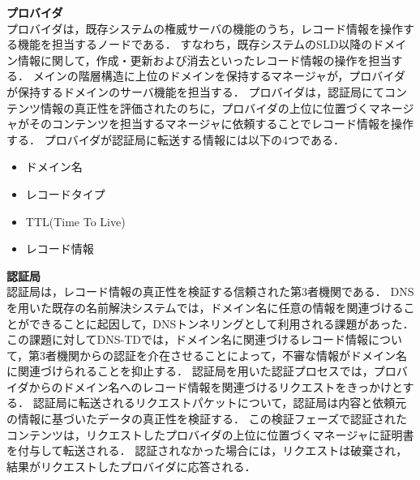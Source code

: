 \newpage
\hspace{-12pt}\textbf{プロバイダ}\\
\hspace{12pt}プロバイダは，既存システムの権威サーバの機能のうち，レコード情報を操作する機能を担当するノードである．
すなわち，既存システムのSLD以降のドメイン情報に関して，作成・更新および消去といったレコード情報の操作を担当する．
メインの階層構造に上位のドメインを保持するマネージャが，プロバイダが保持するドメインのサーバ機能を担当する．
プロバイダは，認証局にてコンテンツ情報の真正性を評価されたのちに，プロバイダの上位に位置づくマネージャがそのコンテンツを担当するマネージャに依頼することでレコード情報を操作する．
プロバイダが認証局に転送する情報には以下の4つである．
\begin{itemize}
 \item ドメイン名
 \vspace{-3mm}
 \item レコードタイプ
 \vspace{-3mm}
 \item TTL(Time To Live)
 \vspace{-3mm}
 \item レコード情報
\end{itemize}

\newpage
\hspace{-12pt}\textbf{認証局}\\
\hspace{12pt}認証局は，レコード情報の真正性を検証する信頼された第3者機関である．
DNSを用いた既存の名前解決システムでは，ドメイン名に任意の情報を関連づけることができることに起因して，DNSトンネリングとして利用される課題があった．
この課題に対してDNS-TDでは，ドメイン名に関連づけるレコード情報について，第3者機関からの認証を介在させることによって，不審な情報がドメイン名に関連づけられることを抑止する．
認証局を用いた認証プロセスでは，プロバイダからのドメイン名へのレコード情報を関連づけるリクエストをきっかけとする．
認証局に転送されるリクエストパケットについて，認証局は内容と依頼元の情報に基づいたデータの真正性を検証する．
この検証フェーズで認証されたコンテンツは，リクエストしたプロバイダの上位に位置づくマネージャに証明書を付与して転送される．
認証されなかった場合には，リクエストは破棄され，結果がリクエストしたプロバイダに応答される．

